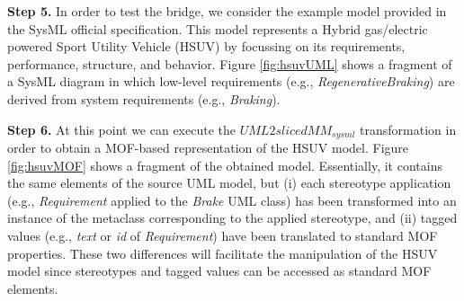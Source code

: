 \textbf{Step 5.} In order to test the bridge, we consider the example model provided in the SysML official specification.
This model represents a Hybrid gas/electric powered Sport Utility Vehicle (HSUV) by focussing on its requirements, performance, structure, and behavior.
Figure \ref{fig:hsuvUML} shows a fragment of a SysML diagram in which low-level requirements
(e.g., \textit{RegenerativeBraking})
are derived from system requirements (e.g., \textit{Braking}).

\textbf{Step 6.} At this point we can execute the $UML2slicedMM_{sysml}$ transformation in order to obtain a MOF-based representation
of the HSUV model. Figure \ref{fig:hsuvMOF} shows a fragment of the obtained model.
Essentially, it contains the same elements of the source UML model, but (i) each stereotype application (e.g., \textit{Requirement}
applied to the \textit{Brake} UML class) has been transformed into an instance of the metaclass corresponding to the applied stereotype,
and (ii) tagged values (e.g., \textit{text} or \textit{id} of \textit{Requirement})
have been translated to standard MOF properties. These two differences will facilitate
the manipulation of the HSUV model since stereotypes and tagged values can be accessed as standard MOF elements.
%
\vspace{-.4cm}
